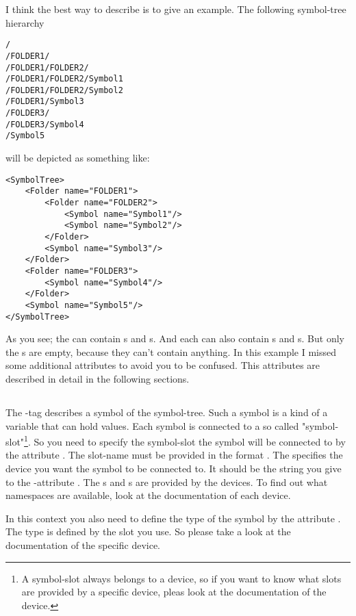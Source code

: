 I think the best way to describe is to give an example. The following symbol-tree hierarchy
\begin{verbatim}
/
/FOLDER1/
/FOLDER1/FOLDER2/
/FOLDER1/FOLDER2/Symbol1
/FOLDER1/FOLDER2/Symbol2
/FOLDER1/Symbol3
/FOLDER3/
/FOLDER3/Symbol4
/Symbol5
\end{verbatim}
will be depicted as something like:
\begin{verbatim}
<SymbolTree>
    <Folder name="FOLDER1">
        <Folder name="FOLDER2">
            <Symbol name="Symbol1"/>
            <Symbol name="Symbol2"/>
        </Folder>
        <Symbol name="Symbol3"/>
    </Folder>    
    <Folder name="FOLDER3">
        <Symbol name="Symbol4"/>
    </Folder>
    <Symbol name="Symbol5"/>
</SymbolTree>
\end{verbatim}
As you see; the  can contain s and s. And each  can
also contain s and s. But only the s are empty, because they can't contain
anything. In this example I missed some additional attributes to avoid you to be confused. This attributes are described 
in detail in the following sections.

\subsection{}
The -tag describes a symbol of the symbol-tree. Such a symbol is a kind of a variable that can hold values.
Each symbol is connected to a so called "symbol-slot"\footnote{A symbol-slot always belongs to a device, so if you want to know 
what slots are provided by a specific device, pleas look at the documentation of the device.}. So you need to specify the 
symbol-slot the symbol will be connected to by the attribute . The slot-name must be provided in the format 
. The  specifies the device you want the symbol to be
connected to. It should be the string you give to the -attribute . The s and
s are provided by the devices. To find out what namespaces are available, look at the documentation of 
each device.

In this context you also need to define the type of the symbol by the attribute . The type is defined by the
slot you use. So please take a look at the documentation of the specific device.

